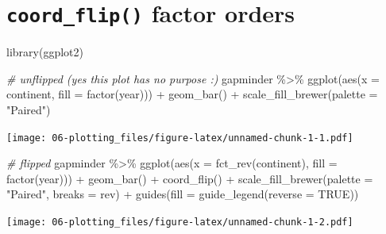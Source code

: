 \documentclass[
]{book}
\newenvironment{Shaded}{\begin{snugshade}}{\end{snugshade}}
\newcommand{\AttributeTok}[1]{\textcolor[rgb]{0.77,0.63,0.00}{#1}}
\newcommand{\CommentTok}[1]{\textcolor[rgb]{0.56,0.35,0.01}{\textit{#1}}}
\newcommand{\ConstantTok}[1]{\textcolor[rgb]{0.00,0.00,0.00}{#1}}
\newcommand{\FunctionTok}[1]{\textcolor[rgb]{0.00,0.00,0.00}{#1}}
\newcommand{\NormalTok}[1]{#1}
\newcommand{\SpecialCharTok}[1]{\textcolor[rgb]{0.00,0.00,0.00}{#1}}
\newcommand{\StringTok}[1]{\textcolor[rgb]{0.31,0.60,0.02}{#1}}
\begin{document}
\hypertarget{coord_flip-factor-orders}{%
\section{\texorpdfstring{\texttt{coord\_flip()} factor orders}{coord\_flip() factor orders}}\label{coord_flip-factor-orders}}

\begin{Shaded}
\begin{Highlighting}[]
\FunctionTok{library}\NormalTok{(ggplot2)}

\CommentTok{\# unflipped (yes this plot has no purpose :)}
\NormalTok{gapminder }\SpecialCharTok{\%\textgreater{}\%} 
  \FunctionTok{ggplot}\NormalTok{(}\FunctionTok{aes}\NormalTok{(}\AttributeTok{x =}\NormalTok{ continent, }\AttributeTok{fill =} \FunctionTok{factor}\NormalTok{(year))) }\SpecialCharTok{+} 
  \FunctionTok{geom\_bar}\NormalTok{() }\SpecialCharTok{+} 
  \FunctionTok{scale\_fill\_brewer}\NormalTok{(}\AttributeTok{palette =} \StringTok{"Paired"}\NormalTok{)}
\end{Highlighting}
\end{Shaded}

\texttt{[image: 06-plotting\_files/figure-latex/unnamed-chunk-1-1.pdf]}

\begin{Shaded}
\begin{Highlighting}[]
\CommentTok{\# flipped}
\NormalTok{gapminder }\SpecialCharTok{\%\textgreater{}\%} 
  \FunctionTok{ggplot}\NormalTok{(}\FunctionTok{aes}\NormalTok{(}\AttributeTok{x =} \FunctionTok{fct\_rev}\NormalTok{(continent), }\AttributeTok{fill =} \FunctionTok{factor}\NormalTok{(year))) }\SpecialCharTok{+} 
  \FunctionTok{geom\_bar}\NormalTok{() }\SpecialCharTok{+} 
  \FunctionTok{coord\_flip}\NormalTok{() }\SpecialCharTok{+} 
  \FunctionTok{scale\_fill\_brewer}\NormalTok{(}\AttributeTok{palette =} \StringTok{"Paired"}\NormalTok{, }\AttributeTok{breaks =}\NormalTok{ rev) }\SpecialCharTok{+} 
  \FunctionTok{guides}\NormalTok{(}\AttributeTok{fill =} \FunctionTok{guide\_legend}\NormalTok{(}\AttributeTok{reverse =} \ConstantTok{TRUE}\NormalTok{))}
\end{Highlighting}
\end{Shaded}

\texttt{[image: 06-plotting\_files/figure-latex/unnamed-chunk-1-2.pdf]}
\end{document}
